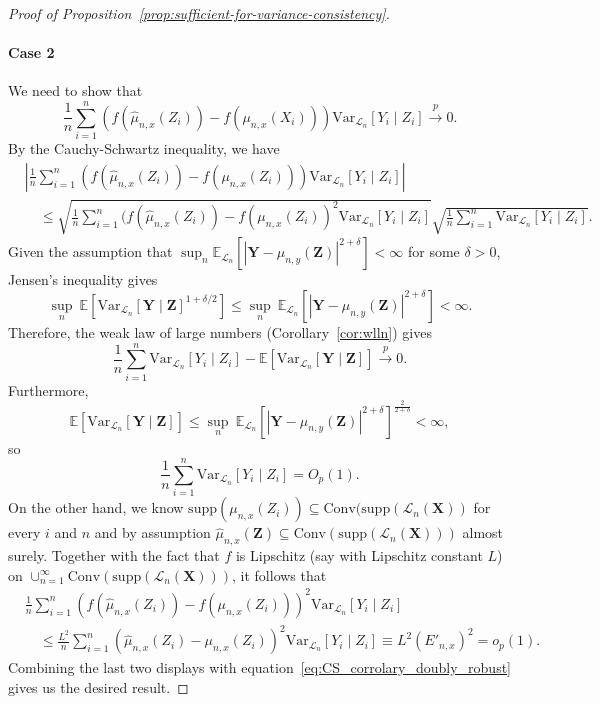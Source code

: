 \documentclass[aos]{imsart}
\theoremstyle{definition}
\theoremstyle{remark}
\newcommand{\E}{\mathbb E}								%
\newcommand{\V}{\mathrm{Var}}							%
\newcommand{\convp}{\overset p \rightarrow}             %
\newcommand{\prx}{\bm X}								%
\newcommand{\srx}{X}									%
\newcommand{\prz}{\bm Z}								%
\newcommand{\srz}{Z}									%
\newcommand{\pry}{{\bm Y}}								%
\newcommand{\sry}{Y}									%
\newcommand{\law}{\mathcal L}							%
\begin{document}
\begin{proof}[Proof of Proposition~\ref{prop:sufficient-for-variance-consistency}]
\paragraph*{Case 2}
We need to show that
$$
\frac{1}{n} \sum_{i=1}^n (f(\widehat \mu_{n,x}(Z_i))-f(\mu_{n,x}(\srx_i)))\V_{\law_n}[\sry_i\mid \srz_i] \convp 0.
$$
By the Cauchy-Schwartz inequality, we have
\begin{equation}
\begin{split} \label{eq:CS_corrolary_doubly_robust}
	&\left|\frac{1}{n} \sum_{i=1}^n (f(\widehat \mu_{n,x}(\srz_i))-f(\mu_{n,x}(\srz_i)))\V_{\law_n}[\sry_i\mid \srz_i]\right| \\ &\quad\leq \sqrt{\frac{1}{n} \sum_{i=1}^n (f(\widehat \mu_{n,x}(Z_i))-f( \mu_{n,x}(Z_i))^2\V_{\law_n}[\sry_i\mid \srz_i]}\sqrt{\frac{1}{n} \sum_{i=1}^n \V_{\law_n}[\sry_i\mid \srz_i]}.
\end{split}
\end{equation}
Given the assumption that $\sup_n \E_{\law_n}[|\pry-\mu_{n,y}(\prz)|^{2+\delta}] < \infty$ for some $\delta>0$, Jensen's inequality gives
\begin{equation*}
	\sup_n\ \E[\V_{\law_n}[\pry\mid \prz]^{1+\delta/2}] \leq \sup_n\ \E_{\law_n}[|\pry-\mu_{n,y}(\prz)|^{2+\delta}] < \infty.
\end{equation*}
Therefore, the weak law of large numbers (Corollary~\ref{cor:wlln}) gives
\begin{equation*}
\frac{1}{n} \sum_{i=1}^n \V_{\law_n}[\sry_i\mid \srz_i]- \E[\V_{\law_n}[\pry\mid \prz]]\convp 0.
\end{equation*}
Furthermore, 
\begin{equation*}
\E[\V_{\law_n}[\pry\mid \prz]] \leq \sup_n\ \E_{\law_n}[|\pry-\mu_{n,y}(\prz)|^{2+\delta}]^{\frac2{2+\delta}} < \infty,
\end{equation*}
so 
\begin{equation*}
	\frac{1}{n} \sum_{i=1}^n \V_{\law_n}[\sry_i\mid \srz_i] = O_p(1).
\end{equation*}
On the other hand, we know $\mathrm{supp}(\mu_{n,x}(Z_i))\subseteq \mathrm{Conv}(\mathrm{supp}(\law_n(\prx))$ for every $i$ and $n$ and by assumption $\widehat{\mu}_{n,x}(\prz)\subseteq\mathrm{Conv}(\mathrm{supp}(\law_n(\prx)))$ almost surely. Together with the fact that $f$ is Lipschitz (say with Lipschitz constant $L$) on $\cup_{n=1}^{\infty}\mathrm{Conv}(\mathrm{supp}(\law_n(\prx)))$, it follows that
\begin{align*}
&\frac{1}{n} \sum_{i=1}^n (f(\widehat \mu_{n,x}(Z_i))-f( \mu_{n,x}(Z_i)))^2\V_{\law_n}[\sry_i\mid \srz_i] \\
&\quad\leq 
\frac{L^2}{n} \sum_{i=1}^n (\widehat \mu_{n,x}(Z_i)- \mu_{n,x}(Z_i))^2\V_{\law_n}[\sry_i\mid \srz_i] \equiv L^2(E'_{n,x})^2 = o_p(1).
\end{align*}
Combining the last two displays with equation~\eqref{eq:CS_corrolary_doubly_robust} gives us the desired result.
\end{proof}
\end{document}
